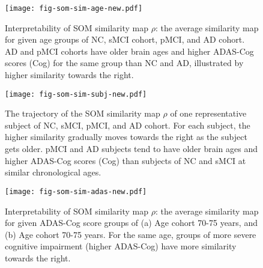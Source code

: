 \documentclass[runningheads]{llncs}
\begin{document}
\begin{figure}
\centering
\texttt{[image: fig-som-sim-age-new.pdf]}
\vspace{-10pt}
\caption{Interpretability of SOM similarity map $\rho$: the average similarity map for given age groups of NC, sMCI cohort, pMCI, and AD cohort. AD and pMCI cohorts have older brain ages and higher ADAS-Cog scores (Cog) for the same group than NC and AD, illustrated by higher similarity towards the right.}
\label{fig:som-sim-age}
\end{figure}


\begin{figure}[t]
\centering
\texttt{[image: fig-som-sim-subj-new.pdf]}
\vspace{-10pt}
\caption{The trajectory of the SOM similarity map $\rho$ of one representative subject of NC, sMCI, pMCI, and AD cohort. For each subject, the higher similarity gradually moves towards the right as the subject gets older. pMCI and AD subjects tend to have older brain ages and higher ADAS-Cog scores (Cog) than subjects of NC and sMCI at similar chronological ages.}
\label{fig:som-sim-subj}
\end{figure}

\clearpage
\begin{figure}
\centering
\texttt{[image: fig-som-sim-adas-new.pdf]}
\vspace{-10pt}
\caption{Interpretability of SOM similarity map $\rho$: the average similarity map for given ADAS-Cog score groups of (a) Age cohort 70-75 years, and (b) Age cohort 70-75 years. For the same age, groups of more severe cognitive impairment (higher ADAS-Cog) have more similarity towards the right.}
\label{fig:som-sim-adas}
\end{figure}
\end{document}
